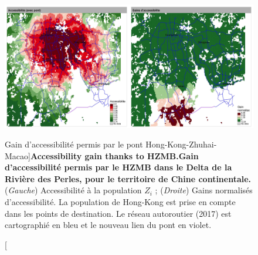 
\begin{figure}
	\includegraphics[width=\linewidth]{Figures/Final/1-2-1-fig-casestudies-prd.jpg}
	\caption[Accessibility gain thanks to HZMB][Gain d'accessibilité permis par le pont Hong-Kong-Zhuhai-Macao]{\textbf{Accessibility gain thanks to HZMB.}\label{fig:casestudies:prd}}{\textbf{Gain d'accessibilité permis par le HZMB dans le Delta de la Rivière des Perles, pour le territoire de Chine continentale.} (\textit{Gauche}) Accessibilité à la population $Z_i$ ; (\textit{Droite}) Gains normalisés d'accessibilité. La population de Hong-Kong est prise en compte dans les points de destination. Le réseau autoroutier (2017) est cartographié en bleu et le nouveau lien du pont en violet.\label{fig:casestudies:prd}}
\end{figure}


